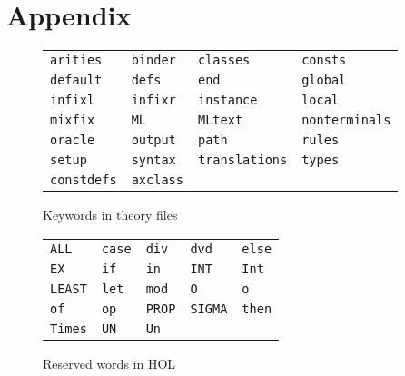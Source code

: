\appendix

\chapter{Appendix}
\label{sec:Appendix}

\begin{figure}[htbp]
\begin{center}
\begin{tabular}{|llll|}
\hline
\texttt{arities} &
\texttt{binder} &
\texttt{classes} &
\texttt{consts} \\
\texttt{default} &
\texttt{defs} &
\texttt{end} &
\texttt{global} \\
\texttt{infixl} &
\texttt{infixr} &
\texttt{instance} &
\texttt{local} \\
\texttt{mixfix} &
\texttt{ML} &
\texttt{MLtext} &
\texttt{nonterminals} \\
\texttt{oracle} &
\texttt{output} &
\texttt{path} &
\texttt{rules} \\
\texttt{setup} &
\texttt{syntax} &
\texttt{translations} &
\texttt{types} \\
\texttt{constdefs} &
\texttt{axclass} &&\\
\hline
\end{tabular}
\end{center}
\caption{Keywords in theory files}
\label{fig:keywords}
\end{figure}

\begin{figure}[htbp]
\begin{center}
\begin{tabular}{|lllll|}
\hline
\texttt{ALL} &
\texttt{case} &
\texttt{div} &
\texttt{dvd} &
\texttt{else} \\
\texttt{EX} &
\texttt{if} &
\texttt{in} &
\texttt{INT} &
\texttt{Int} \\
\texttt{LEAST} &
\texttt{let} &
\texttt{mod} &
\texttt{O} &
\texttt{o} \\
\texttt{of} &
\texttt{op} &
\texttt{PROP} &
\texttt{SIGMA} &
\texttt{then} \\
\texttt{Times} &
\texttt{UN} &
\texttt{Un} &&\\
\hline
\end{tabular}
\end{center}
\caption{Reserved words in HOL}
\label{fig:ReservedWords}
\end{figure}
